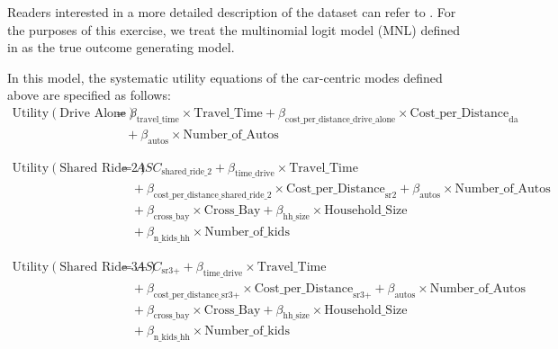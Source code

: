 Readers interested in a more detailed description of the dataset can refer to \citet{brathwaite_asymmetric}.
For the purposes of this exercise, we treat the multinomial logit model (MNL) defined in \citet{brathwaite_asymmetric} as the true outcome generating model.

In this model, the systematic utility equations of the car-centric modes defined above are specified as follows:
\begin{equation}
   \begin{aligned}
   \label{eq:DA}
   \textrm{Utility} \left(\textrm{Drive Alone}\right) &= \beta_{\textrm{travel\_time}} \times \textrm{Travel\_Time} + \beta_{\textrm{cost\_per\_distance\_drive\_alone}} \times \textrm{Cost\_per\_Distance}_{\textrm{da}} \\
   &\quad + \beta_{\textrm{autos}} \times \textrm{Number\_of\_Autos}
   \end{aligned}
\end{equation}

\begin{equation}
   \begin{aligned}
   \label{eq:SR2}
   \textrm{Utility} \left(\textrm{Shared Ride 2}\right) &= ASC_{\textrm{shared\_ride\_2}} + \beta_{\textrm{time\_drive}} \times \textrm{Travel\_Time} \\
   &\quad + \beta_{\textrm{cost\_per\_distance\_shared\_ride\_2}} \times \textrm{Cost\_per\_Distance}_{ \textrm{sr2} } + \beta_{\textrm{autos}}  \times \textrm{Number\_of\_Autos} \\
   &\quad + \beta_{\textrm{cross\_bay}} \times \textrm{Cross\_Bay} + \beta_{\textrm{hh\_size}} \times \textrm{Household\_Size} \\
   &\quad + \beta_{\textrm{n\_kids\_hh}} \times \textrm{Number\_of\_kids}
   \end{aligned}
\end{equation}

\begin{equation}
   \begin{aligned}
   \label{eq:SR3+}
   \textrm{Utility} \left(\textrm{Shared Ride 3+}\right) &= ASC_{\textrm{sr3+}} + \beta_{\textrm{time\_drive}} \times \textrm{Travel\_Time} \\
   &\quad + \beta_{\textrm{cost\_per\_distance\_sr3+}} \times \textrm{Cost\_per\_Distance}_{\textrm{sr3+}} + \beta_{\textrm{autos}}  \times \textrm{Number\_of\_Autos} \\
   &\quad + \beta_{\textrm{cross\_bay}} \times \textrm{Cross\_Bay} + \beta_{\textrm{hh\_size}} \times \textrm{Household\_Size} \\
   &\quad + \beta_{\textrm{n\_kids\_hh}} \times \textrm{Number\_of\_kids}
   \end{aligned}
\end{equation}

